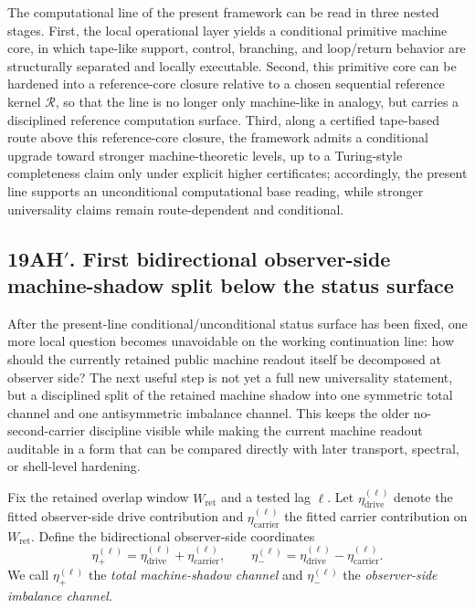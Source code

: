 \begin{remark}
The computational line of the present framework can be read in three nested stages. First, the local operational layer yields a conditional primitive machine core, in which tape-like support, control, branching, and loop/return behavior are structurally separated and locally executable. Second, this primitive core can be hardened into a reference-core closure relative to a chosen sequential reference kernel \(\mathcal R\), so that the line is no longer only machine-like in analogy, but carries a disciplined reference computation surface. Third, along a certified tape-based route above this reference-core closure, the framework admits a conditional upgrade toward stronger machine-theoretic levels, up to a Turing-style completeness claim only under explicit higher certificates; accordingly, the present line supports an unconditional computational base reading, while stronger universality claims remain route-dependent and conditional.
\end{remark}




\subsection*{19AH$'$. First bidirectional observer-side machine-shadow split below the status surface}
After the present-line conditional/unconditional status surface has been fixed, one more local question becomes unavoidable on the working continuation line: how should the currently retained public machine readout itself be decomposed at observer side? The next useful step is not yet a full new universality statement, but a disciplined split of the retained machine shadow into one symmetric total channel and one antisymmetric imbalance channel. This keeps the older no-second-carrier discipline visible while making the current machine readout auditable in a form that can be compared directly with later transport, spectral, or shell-level hardening.

\begin{definition}
Fix the retained overlap window \(W_{\mathrm{ret}}\) and a tested lag \(\ell\). Let \(\eta_{\mathrm{drive}}^{(\ell)}\) denote the fitted observer-side drive contribution and \(\eta_{\mathrm{carrier}}^{(\ell)}\) the fitted carrier contribution on \(W_{\mathrm{ret}}\). Define the bidirectional observer-side coordinates
\[
\eta_+^{(\ell)}=\eta_{\mathrm{drive}}^{(\ell)}+\eta_{\mathrm{carrier}}^{(\ell)},
\qquad
\eta_-^{(\ell)}=\eta_{\mathrm{drive}}^{(\ell)}-\eta_{\mathrm{carrier}}^{(\ell)}.
\]
We call \(\eta_+^{(\ell)}\) the \emph{total machine-shadow channel} and \(\eta_-^{(\ell)}\) the \emph{observer-side imbalance channel}.
\end{definition}

